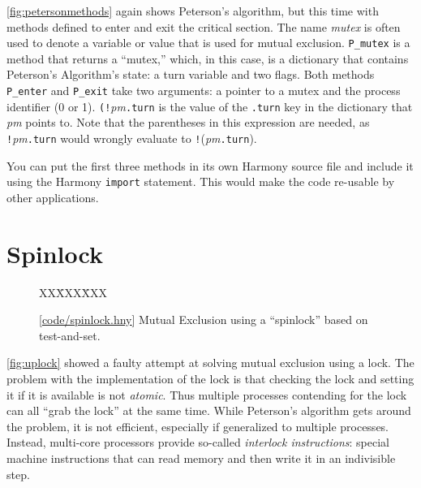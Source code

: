 \documentclass{report}
\newcommand{\harmonysource}[1]{
\begin{tabbing}
XX\=XXX\=XXX\kill
    
\end{tabbing}
}
\newcommand{\harmonylink}[1]{%
[\href{https://www.cs.cornell.edu/home/rvr/harmony/#1}{\underline{#1}}]%
}
\newenvironment{code}{
\tcolorbox
}{
\endtcolorbox
}
\begin{document}
\autoref{fig:petersonmethods} again shows Peterson's algorithm,
but this time with methods defined to enter and exit the critical
section.
The name \textit{mutex} is often used to denote a variable or value
that is used for mutual exclusion.
\texttt{P\_mutex} is a method that returns a ``mutex,'' which, in this
case, is a dictionary that contains Peterson's Algorithm's state:
a turn variable and two flags.
Both methods \texttt{P\_enter} and \texttt{P\_exit} take two arguments:
a pointer to a mutex and the process identifier (0 or 1).
\texttt{(!{}}\textit{pm}\texttt{.turn} is the value of the \texttt{.turn} key
in the dictionary that \textit{pm} points to. 
Note that the parentheses in this expression
are needed, as \texttt{!{}}\textit{pm}\texttt{.turn} would wrongly evaluate to
\texttt{!{}}(\textit{pm}\texttt{.turn}).

You can put the first three methods in its own Harmony source file
and include it using the Harmony \texttt{import} statement.
%
%
This would
make the code re-usable by other applications.

\chapter{Spinlock}
\label{ch:spinlock}
%

%

\begin{figure}
\begin{code}
\harmonysource{spinlock}
\end{code}
\caption{\harmonylink{code/spinlock.hny} Mutual Exclusion using a ``spinlock'' based on test-and-set.}
\label{fig:tas}
\end{figure}

\autoref{fig:uplock} showed a faulty attempt at solving mutual
exclusion using a lock.  The problem with the implementation of the
lock is that checking the lock and setting it if it is available is
not \emph{atomic}.  Thus multiple processes contending for the lock
can all ``grab the lock'' at the same time.  While Peterson's
algorithm gets around the problem, it is not efficient, especially
if generalized to multiple processes.  Instead, multi-core processors provide
so-called \emph{interlock instructions}:
%
special machine instructions
that can read memory and then write it in an indivisible step.

%
\end{document}
